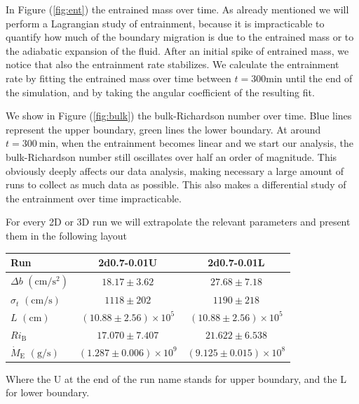 In Figure (\ref{fig:ent}) the entrained mass over time. As already mentioned we will perform a Lagrangian study of entrainment, because it is impracticable to quantify how much of the boundary migration is due to the entrained mass or to the adiabatic expansion of the fluid. After an initial spike of entrained mass, we notice that also the entrainment rate stabilizes. We calculate the entrainment rate by fitting the entrained mass over time between $t = 300 \mathrm{min}$ until the end of the simulation, and by taking the angular coefficient of the resulting fit. 

We show in Figure (\ref{fig:bulk}) the bulk-Richardson number over time. Blue lines represent the upper boundary, green lines the lower boundary. At around $t=\mathrm{300 \ min}$, when the entrainment becomes linear and we start our analysis, the bulk-Richardson number still oscillates over half an order of magnitude. This obviously deeply affects our data analysis, making necessary a large amount of runs to collect as much data as possible. This also makes a differential study of the entrainment over time impracticable. 

For every 2D or 3D run we will extrapolate the relevant parameters and present them in the following layout
\begin{center}
 \begin{tabular}{l|c|c}
	 Run &2d0.7-0.01U&2d0.7-0.01L\\
	  	\hline
	   $\Delta b$ $(\mathrm{cm/s^{2}})$&$ 18.17 \pm 3.62 $&$27.68 \pm 7.18$\\
		\hline
	   $\sigma_t$ $(\mathrm{cm/s})$ &$ 1118 \pm 202 $&$1190 \pm 218$\\
		\hline
	   $L$ $(\mathrm{cm})$&$(10.88 \pm 2.56) \times 10^5$&$(10.88 \pm 2.56) \times 10^5$\\
		\hline
	   $Ri_{\mathrm{B}}$& $17.070 \pm 7.407 $&$21.622 \pm 6.538$\\
		\hline
	   $\dot{M}_{\mathrm{E}}$ $(\mathrm{g/s})$ &$(1.287 \pm 0.006) \times 10^9$&$(9.125 \pm 0.015) \times 10^8$\\
      \end{tabular}
 \end{center}
 Where the U at the end of the run name stands for upper boundary, and the L for lower boundary. 

 \new{

}
